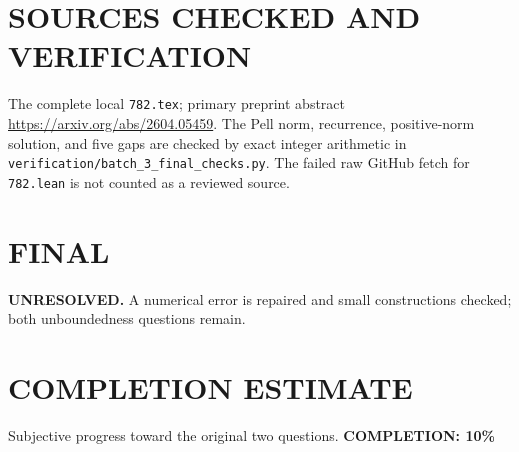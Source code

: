 \section{SOURCES CHECKED AND VERIFICATION}
The complete local \texttt{782.tex}; primary preprint abstract \url{https://arxiv.org/abs/2604.05459}. The Pell norm, recurrence, positive-norm solution, and five gaps are checked by exact integer arithmetic in \texttt{verification/batch\_3\_final\_checks.py}. The failed raw GitHub fetch for \texttt{782.lean} is not counted as a reviewed source.
\section{FINAL}
\textbf{UNRESOLVED.} A numerical error is repaired and small constructions checked; both unboundedness questions remain.
\section{COMPLETION ESTIMATE}
Subjective progress toward the original two questions.
\textbf{COMPLETION: 10\%}
